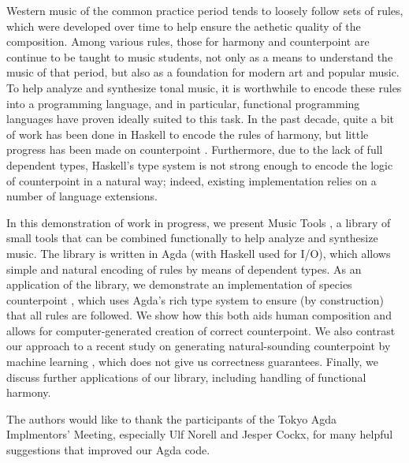 \documentclass[sigplan,review]{acmart}\settopmatter{printfolios=true,printccs=false,printacmref=false}
\begin{document}
Western music of the common practice period tends to loosely
follow sets of rules, which were developed over time to help
ensure the aethetic quality of the composition. 
Among various rules, those for harmony \citep{piston1987harmony}
and counterpoint \citep{fux1965study} are continue to be taught
to music students, not only as a means to understand the music of
that period, but also as a foundation for modern art and popular music.
To help analyze and synthesize tonal music, it is worthwhile to encode
these rules into a programming language, and in particular, functional
programming languages have proven ideally suited to this task.
In the past decade, quite a bit of work has been done in Haskell
\citep{fmmh, hihseufha, faamh, hafha, fghm} to encode the rules of harmony,
but little progress has been made on counterpoint \citep{mezzo}.
Furthermore, due to the lack of full dependent types, Haskell's
type system is not strong enough to encode the logic of counterpoint
in a natural way; indeed, existing implementation relies on a number
of language extensions.

In this demonstration of work in progress, we present Music Tools
\citep{MusicTools}, a library of small tools that can be combined
functionally to help analyze and synthesize music.
The library is written in Agda (with Haskell used for I/O), which
allows simple and natural encoding of rules by means of dependent types.
As an application of the library, we demonstrate an implementation of 
species counterpoint \citep{fux1965study}, which uses Agda's rich type
system to ensure (by construction) that all rules are followed.
We show how this both aids human composition and allows for
computer-generated creation of correct counterpoint.
We also contrast our approach to a recent study on generating
natural-sounding counterpoint by machine learning
\citep{CounterpointByConvolution}, which does not give us correctness
guarantees.
Finally, we discuss further applications of our library, including handling 
of functional harmony.


\begin{acks}                            %
 The authors would like to thank the participants of the Tokyo Agda 
 Implmentors' Meeting, especially Ulf Norell and Jesper Cockx,
 for many helpful suggestions that improved our Agda code.
\end{acks}



\end{document}
